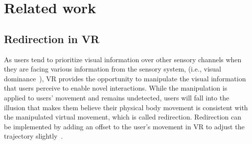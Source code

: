 \section{Related work}
\label{section:related_work}

\subsection{Redirection in VR}

As users tend to prioritize visual information over other sensory channels when they are facing various information from the sensory system, (i.e., visual dominance~\cite{rock1964vision, gibson1933adaptation}), VR provides the opportunity to manipulate the visual information that users perceive to enable novel interactions.
While the manipulation is applied to users' movement and remains undetected, users will fall into the illusion that makes them believe their physical body movement is consistent with the manipulated virtual movement, which is called redirection.
Redirection can be implemented by adding an offset to the user's movement in VR to adjust the trajectory slightly~\cite{kohli2012redirected, gonzalez2023sensorimotor}.

